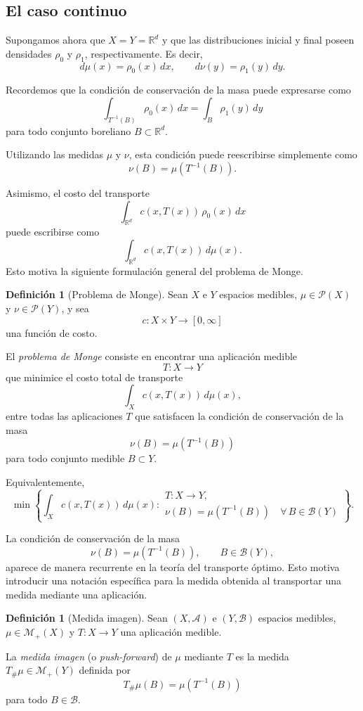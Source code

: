 \documentclass[12pt, a4paper]{amsbook}
\theoremstyle{remark}
\theoremstyle{definition}
\newtheorem{defi}[teo]{Definición}
\numberwithin{section}{chapter}
\numberwithin{subsection}{section}
\numberwithin{equation}{section}
\numberwithin{figure}{chapter}
\begin{document}
\subsection{El caso continuo}

Supongamos ahora que \(X=Y=\mathbb R^d\) y que las distribuciones inicial y final poseen densidades \(\rho_0\) y \(\rho_1\), respectivamente. Es decir,
\[
d\mu(x)=\rho_0(x)\,dx,
\qquad
d\nu(y)=\rho_1(y)\,dy.
\]

Recordemos que la condición de conservación de la masa puede expresarse como
\[
\int_{T^{-1}(B)} \rho_0(x)\,dx
=
\int_B \rho_1(y)\,dy
\]
para todo conjunto boreliano \(B\subset\mathbb R^d\).

Utilizando las medidas \(\mu\) y \(\nu\), esta condición puede reescribirse simplemente como
\[
\nu(B)=\mu(T^{-1}(B)).
\]

Asimismo, el costo del transporte
\[
\int_{\mathbb R^d} c(x,T(x))\,\rho_0(x)\,dx
\]
puede escribirse como
\[
\int_{\mathbb R^d} c(x,T(x))\,d\mu(x).
\]
Esto motiva la siguiente formulación general del problema de Monge.

\begin{defi}[Problema de Monge]
Sean \(X\) e \(Y\) espacios medibles, \(\mu\in\mathcal P(X)\) y
\(\nu\in\mathcal P(Y)\), y sea
\[
c\colon X\times Y\to[0,\infty]
\]
una función de costo.

El \emph{problema de Monge} consiste en encontrar una aplicación medible
\[
T\colon X\to Y
\]
que minimice el costo total de transporte
\[
\int_X c(x,T(x))\,d\mu(x),
\]
entre todas las aplicaciones $T$ que satisfacen la condición de conservación de la masa
\[
\nu(B)=\mu(T^{-1}(B))
\]
para todo conjunto medible \(B\subset Y\).

Equivalentemente,
\[
\min\left\{
\int_X c(x,T(x))\,d\mu(x)
:
\begin{array}{l}
T\colon X\to Y,\\[1mm]
\nu(B)=\mu(T^{-1}(B))
\quad\forall\,B\in\mathcal B(Y)
\end{array}
\right\}.
\]
\end{defi}

La condición de conservación de la masa
\[
\nu(B)=\mu(T^{-1}(B)),
\qquad
B\in\mathcal B(Y),
\]
aparece de manera recurrente en la teoría del transporte óptimo. Esto motiva introducir una notación específica para la medida obtenida al transportar una medida mediante una aplicación.
\begin{defi}[Medida imagen]
Sean \((X,\mathcal A)\) e \((Y,\mathcal B)\) espacios medibles,
\(\mu\in\mathcal M_+(X)\) y
\(T\colon X\to Y\) una aplicación medible.

La \emph{medida imagen} (o \emph{push-forward}) de \(\mu\) mediante \(T\) es la medida \(T_\#\mu\in\mathcal M_+(Y)\) definida por
\[
T_\#\mu(B)=\mu(T^{-1}(B))
\]
para todo \(B\in\mathcal B\).
\end{defi}
\end{document}
